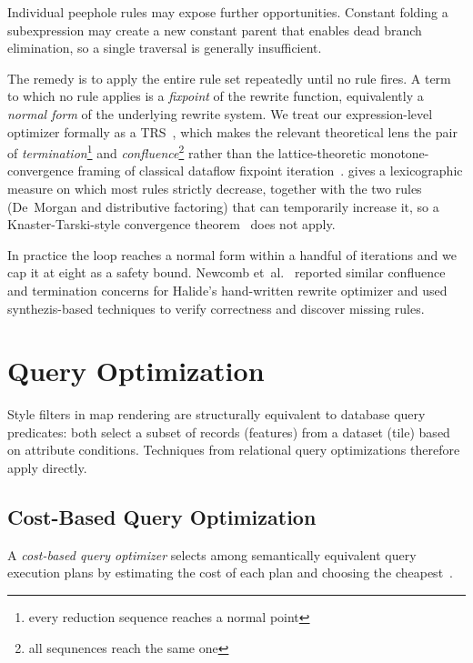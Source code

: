 Individual peephole rules may expose further opportunities.
Constant folding a subexpression may create a new constant parent that enables dead branch elimination, so a single traversal is generally insufficient.

The remedy is to apply the entire rule set repeatedly until no rule fires.
A term to which no rule applies is a \emph{fixpoint} of the rewrite function, equivalently a \emph{normal form} of the underlying rewrite system.
We treat our expression-level optimizer formally as a \ac{TRS}~\cite{baaderTermRewritingAll1999}, which makes the relevant theoretical lens the pair of \emph{termination}\footnote{every reduction sequence reaches a normal point} and \emph{confluence}\footnote{all sequnences reach the same one} rather than the lattice-theoretic monotone-convergence framing of classical dataflow fixpoint iteration~\cite{ahoCompilersPrinciplesTechniques2007}.
 gives a lexicographic measure on which most rules strictly decrease, together with the two rules (De~Morgan and distributive factoring) that can temporarily increase it, so a Knaster-Tarski-style convergence theorem~\cite{tarskiLatticetheoreticalFixpointTheorem1955} does not apply.

In practice the loop reaches a normal form within a handful of iterations and we cap it at eight as a safety bound.
Newcomb et~al.~\cite{newcombVerifyingImprovingHalides2020} reported similar confluence and termination concerns for Halide's hand-written rewrite optimizer and used synthezis-based techniques to verify correctness and discover missing rules.

\section{Query Optimization}\label{sec:query_optimizations}

Style filters in map rendering are structurally equivalent to database query predicates:
both select a subset of records (features) from a dataset (tile) based on attribute conditions.
Techniques from relational query optimizations therefore apply directly.

\subsection{Cost-Based Query Optimization}

A \emph{cost-based query optimizer} selects among semantically equivalent query execution plans by estimating the cost of each plan and choosing the cheapest~\cite{selingerAccessPathSelection1979}.

